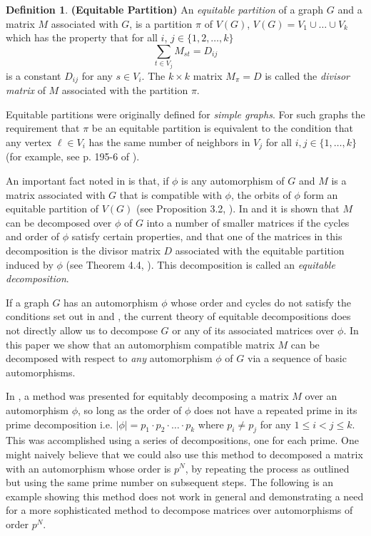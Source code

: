 \documentclass[preprint,12pt]{elsarticle}
\newcommand{\defital}{\textit}
\theoremstyle{definition}
\newtheorem{defn}[thm]{Definition}
\theoremstyle{remark}
\renewcommand{\emph}{\textit}
\begin{document}
\begin{defn}\label{def:EP}\textbf{(Equitable Partition)}
An \emph{equitable partition} of a graph $G$ and a matrix $M$ associated with $G$, is a partition $\pi$ of $V(G)$, $V(G) = V_1 \cup \ldots \cup V_k$ which has the property that for all $i$, $j \in \{1, 2, \ldots, k\}$
\begin{equation}\label{eq:1}
\sum_{t \in V_j} M_{st} = D_{ij}
\end{equation}
is a constant $D_{ij}$ for any  $s \in V_i$. The $k \times k$ matrix $M_\pi = D
$ is called the \defital{divisor matrix} of $M$ associated with the partition $\pi$.
\end{defn}

Equitable partitions were originally defined for \emph{simple graphs}. For such graphs the requirement that $\pi$ be an equitable partition is equivalent to the condition that any vertex $\ell \in V_i$ has the same number of neighbors in $V_j$ for all $i,j \in \{1, \ldots, k\}$ (for example, see p. 195-6 of  \cite{Godsil}).

An important fact noted in \cite{BFW} is that, if $\phi$ is any automorphism of $G$ and $M$ is a matrix associated with $G$ that is compatible with $\phi$, the orbits of $\phi$ form an equitable partition of $V(G)$ (see Proposition 3.2, \cite{BFW}). In \cite{BFW} and \cite{FSSW} it is shown that $M$ can be decomposed over $\phi$ of $G$ into a number of smaller matrices if the cycles and order of $\phi$ satisfy certain properties, and that one of the matrices in this decomposition is the divisor matrix $D$ associated with the equitable partition induced by $\phi$ (see Theorem 4.4, \cite{BFW}). This decomposition is called an \emph{equitable decomposition}.

If a graph $G$ has an automorphism $\phi$ whose order and cycles do not satisfy the conditions set out in \cite{BFW} and \cite{FSSW}, the current theory of equitable decompositions does not directly allow us to decompose $G$ or any of its associated matrices over $\phi$. In this paper we show that an automorphism compatible matrix $M$ can be decomposed with respect to \emph{any} automorphism $\phi$ of $G$ via a sequence of basic automorphisms. 


In \cite{FSSW}, a method was presented for equitably decomposing a matrix $M$ over an automorphism $\phi$, so long as the order of $\phi$ does not have a repeated prime in its prime decomposition i.e. $|\phi |=p_1\cdot p_2\cdot \dots \cdot p_k$ where $p_i\neq p_j$ for any $1\leq i < j \leq k$.  This was accomplished using a series of decompositions, one for each prime. One might naively believe that we could also use this method to decomposed a matrix with an automorphism whose order is $p^N$, by repeating the process as outlined but using the same prime number on subsequent steps.  The following is an example showing this method does  not work in general and demonstrating a  need for a more sophisticated method to decompose matrices over automorphisms of order $p^N$.
\end{document}
